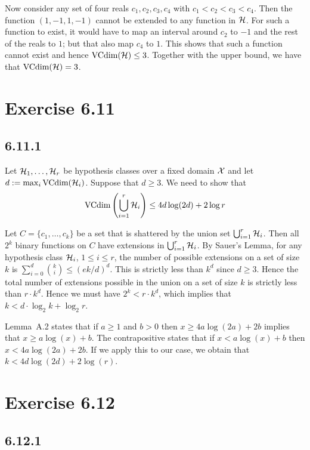 Now consider any set of four reals $c_1, c_2, c_3, c_4$ with $c_1 < c_2 < c_3 <
c_4$.  Then the function $(1, -1, 1, -1)$ cannot be extended to any function in
$\mathcal{H}$.  For such a function to exist, it would have to map an interval
around $c_2$ to $-1$ and the rest of the reals to $1$; but that also map $c_4$
to $1$. This shows that such a function cannot exist and hence
$\text{VCdim} (\mathcal{H}) \leq 3$. Together with the upper bound, we have
that $\text{VCdim}(\mathcal{H}) = 3$.

\section*{Exercise 6.11}

\subsection*{6.11.1}

Let $\mathcal{H}_1, \ldots, \mathcal{H}_r$ be hypothesis classes over a fixed domain
$\mathcal{X}$ and let $d := \max_{i} \text{VCdim} (\mathcal{H}_i )$. Suppose that $d \geq 3$. We need
to show that
\[
    \text{VCdim} \left (\bigcup_{i = 1}^{r} \mathcal{H}_i \right ) \leq 4d \log (2d) + 2 \log r
\]

Let $C = \{c_1, \ldots, c_k\}$ be a set that is shattered by the union set
$\bigcup_{i = 1}^r \mathcal{H}_i$. Then all $2^k$ binary functions on $C$ have
extensions in $\bigcup_{i = 1}^r \mathcal{H}_i$. By Sauer's Lemma, for any
hypothesis class $\mathcal{H}_i$, $1 \leq i \leq r$, the number of possible
extensions on a set of size $k$ is $\sum_{i = 0}^d {k \choose i } \leq (e k/d)^d$.
This is strictly less than $k^d$ since $d \geq 3$. Hence the total number of extensions
possible in the union on a set of size $k$ is strictly less than $r \cdot k^d$. Hence we must
have $2^k < r \cdot k^d$, which implies that
$k < d \cdot \log_2 k + \log_2 r$.

Lemma~A.2 states that if $a \geq 1$ and $b > 0$ then $x \geq 4a \log (2a) + 2b$
implies that $x \geq a \log (x) + b$. The contrapositive states that if
$x < a \log (x) + b$ then $x < 4a \log (2a) + 2b$. If we apply this to our case,
we obtain that $k < 4d \log (2d) + 2 \log (r)$.

\section*{Exercise 6.12}

\subsection*{6.12.1}

